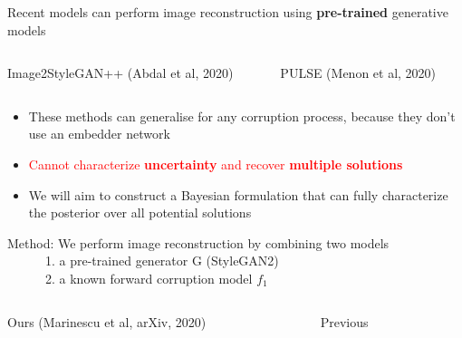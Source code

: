 \begin{frame}{Recent models can perform image reconstruction using \textbf{pre-trained} generative models}
 
\begin{columns}[t]
 \begin{column}{0.6\textwidth}
\centering
Image2StyleGAN++ (Abdal et al, 2020)\\
 \end{column}

 \begin{column}{0.3\textwidth}
  \centering
  PULSE (Menon et al, 2020)\\
 
 \end{column}
\end{columns} 

\vspace{2em}

\begin{itemize}
 \item These methods can generalise for any corruption process, because they don't use an embedder network
 \item \textcolor{red}{Cannot characterize \textbf{uncertainty} and recover \textbf{multiple solutions}}
 \item We will aim to construct a Bayesian formulation that can fully characterize the posterior over all potential solutions
\end{itemize}
\end{frame}


\begin{frame}{Method: We perform image reconstruction by combining two models\\
\ \ \ \ \ \  1. a pre-trained generator G (StyleGAN2)\\
\ \ \ \ \ \  2. a known forward corruption model $f_1$
}



\begin{columns}[t]
 \begin{column}{0.6\textwidth}
\centering
 
\begin{overprint}
 
  \brgmoursshortloss 
  \brgmours

\end{overprint} 
  Ours (Marinescu et al, arXiv, 2020)
 \end{column}

 \begin{column}{0.3\textwidth}
  \centering

  \brgmprev
  Previous

 
 \end{column}
\end{columns} 
 


 
\end{frame}

